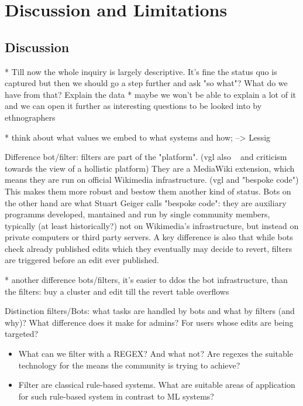 \chapter{Discussion and Limitations}
\label{chap:discussion}

\section{Discussion}

* Till now the whole inquiry is largely descriptive. It's fine the status quo is captured but then we should go a step further and ask "so what"? What do we have from that? Explain the data
  * maybe we won't be able to explain a lot of it and we can open it further as interesting questions to be looked into by ethnographers

* think about what values we embed to what systems and how; --> Lessig

Difference bot/filter: filters are part of the "platform". (vgl also ~\cite{Geiger2014} and criticism towards the view of a hollistic platform)
They are a MediaWiki extension, which means they are run on official Wikimedia infrastructure. (vgl \cite{Geiger2014} and "bespoke code")
This makes them more robust and bestow them another kind of status.
Bots on the other hand are what Stuart Geiger calls "bespoke code": they are auxiliary programms developed, mantained and run by single community members, typically (at least historically?) not on Wikimedia's infrastructure, but instead on private computers or third party servers.
A key difference is also that while bots check already published edits which they eventually may decide to revert, filters are triggered before an edit ever published.

* another difference bots/filters, it's easier to ddos the bot infrastructure, than the filters: buy a cluster and edit till the revert table overflows

Distinction filters/Bots: what tasks are handled by bots and what by filters (and why)? What difference does it make for admins? For users whose edits are being targeted? %

\begin{itemize}
    \item What can we filter with a REGEX? And what not? Are regexes the suitable technology for the means the community is trying to achieve?
    \item Filter are classical rule-based systems. What are suitable areas of application for such rule-based system in contrast to ML systems?
\end{itemize}

